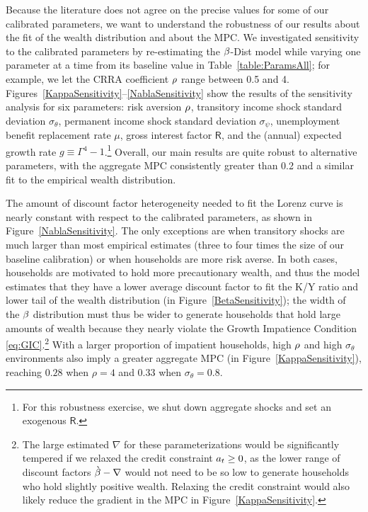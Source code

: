 \documentclass[12pt,titlepage]{econtex}
\begin{document}
Because the literature does not agree on the precise values for some of our calibrated parameters, we want to understand the robustness of our results about the fit of the wealth distribution and about the MPC.
We investigated sensitivity to the calibrated parameters by re-estimating the $\beta$-Dist model while varying one parameter at a time from its baseline value in Table~\ref{table:ParamsAll}; for example, we let the CRRA coefficient $\rho$ range between 0.5 and 4.  Figures~\ref{KappaSensitivity}--\ref{NablaSensitivity} show the results of the sensitivity analysis for six parameters: risk aversion $\rho$, transitory income shock standard deviation $\sigma_\theta$, permanent income shock standard deviation $\sigma_\psi$, unemployment benefit replacement rate $\mu$, gross interest factor $\mathsf{R}$, and the (annual) expected growth rate $g \equiv \Gamma^4 - 1$.\footnote{For this robustness exercise, we shut down aggregate shocks and set an exogenous $\mathsf{R}$.}  Overall, our main results are quite robust to alternative parameters, with the aggregate MPC consistently greater than 0.2 and a similar fit to the empirical wealth distribution.

The amount of discount factor heterogeneity needed to fit the Lorenz curve is nearly constant with respect to the calibrated parameters, as shown in Figure~\ref{NablaSensitivity}.  The only exceptions are when transitory shocks are much larger than most empirical estimates (three to four times the size of our baseline calibration) or when households are more risk averse.  In both cases, households are motivated to hold more precautionary wealth, and thus the model estimates that they have a lower average discount factor to fit the K/Y ratio and lower tail of the wealth distribution (in Figure~\ref{BetaSensitivity}); the width of the $\beta$ distribution must thus be wider to generate households that hold large amounts of wealth because they nearly violate the Growth Impatience Condition \eqref{eq:GIC}.\footnote{The large estimated $\nabla$ for these parameterizations would be significantly tempered if we relaxed the credit constraint $a_t \geq 0$, as the lower range of discount factors $\grave{\beta} - \nabla$ would not need to be so low to generate households who hold slightly positive wealth.  Relaxing the credit constraint would also likely reduce the gradient in the MPC in Figure~\ref{KappaSensitivity}.}  With a larger proportion of impatient households, high $\rho$ and high $\sigma_\theta$ environments also imply a greater aggregate MPC (in Figure~\ref{KappaSensitivity}), reaching $0.28$ when $\rho=4$ and $0.33$ when $\sigma_\theta = 0.8$.
\end{document}

